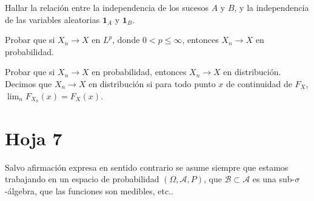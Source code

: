 
\begin{problem}[3] Hallar la relaci\'on entre la independencia de los sucesos $A$ y $B$, y la independencia de las variables aleatorias $\mathbf{1}_A$ y $\mathbf{1}_B$.
\solution

\begin{expla}

\end{expla}

\end{problem}


\begin{problem}[4] Probar que si $X_n\to  X$ en $L^p$, donde  $0 < p \le \infty$, entonces $X_n\to  X$ en probabilidad.
\solution

\begin{expla}

\end{expla}

\end{problem}


\begin{problem}[5] Probar que si $X_n\to  X$ en  probabilidad, entonces $X_n\to  X$ en distribuci\'on. Decimos que
 $X_n\to  X$ en distribuci\'on si para todo punto $x$ de continuidad de $F_X$, $\lim_n F_{X_n} (x) = F_X (x)$.
\solution

\begin{expla}

\end{expla}

\end{problem}



\newpage
\section{Hoja 7}

Salvo afirmaci\'on expresa en sentido
contrario se asume siempre que estamos trabajando en un espacio de probabilidad $(\Omega, \mathcal{A}, P)$,
que  $\mathcal{B}\subset \mathcal{A}$ es una sub-$\sigma$-\'algebra, que las funciones son medibles, etc..


